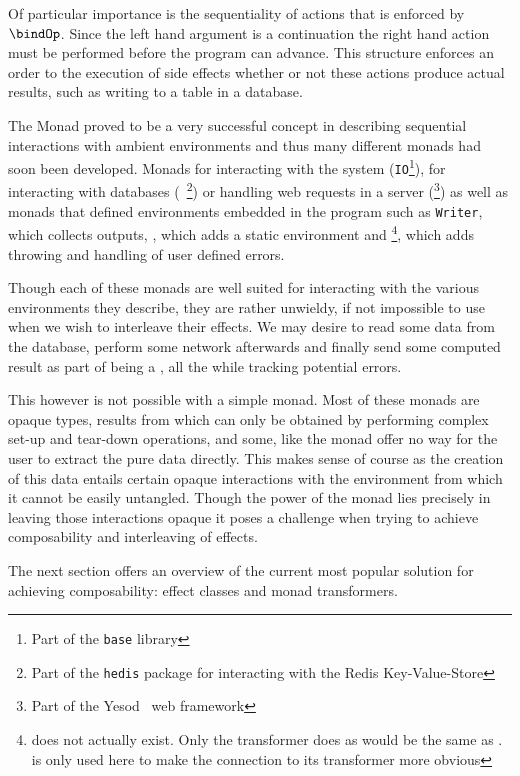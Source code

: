 Of particular importance is the sequentiality of actions that is enforced by
$\bindOp$. Since the left hand argument is a continuation the right hand action
must be performed before the program can advance. This structure enforces an
order to the execution of side effects whether or not these actions produce
actual results, such as writing to a table in a database.

The Monad proved to be a very successful concept in describing
sequential interactions with ambient environments and thus many
different monads had soon been developed. Monads for interacting with
the system (\texttt{IO}\footnote{Part of the \texttt{base} library}),
for interacting with databases (\RedisM{}~\footnote{Part of the
  \texttt{hedis}\cite{hedis} package for interacting with the Redis
  Key-Value-Store}) or handling web requests in a server
(\HandlerForM{}\footnote{Part of the Yesod~\cite{yesod} web
  framework}) as well as monads that defined environments embedded in
the program such as \texttt{Writer}, which collects outputs,
\ReaderM{}, which adds a static environment and
\ExceptM{}\footnote{\ExceptM{} does not actually exist. Only the
  transformer \ExceptT{} does as \ExceptM{} would be the same as
  \EitherM{}. \ExceptM{} is only used here to make the connection to
  its transformer more obvious}, which adds throwing and handling of
user defined errors.

Though each of these monads are well suited for interacting with the
various environments they describe, they are rather unwieldy, if not
impossible to use when we wish to interleave their effects. We may
desire to read some data from the \RedisM{} database, perform some
network \IOM{} afterwards and finally send some computed result as
part of being a \HandlerForM{}, all the while tracking potential
\ExceptM{} errors.

This however is not possible with a simple monad. Most of these monads
are opaque types, results from which can only be obtained by
performing complex set-up and tear-down operations, and some, like the
\HandlerForM{} monad offer no way for the user to extract the pure
data directly. This makes sense of course as the creation of this data
entails certain opaque interactions with the environment from which it
cannot be easily untangled. Though the power of the monad lies
precisely in leaving those interactions opaque it poses a challenge
when trying to achieve composability and interleaving of effects.

The next section offers an overview of the current most popular
solution for achieving composability: effect classes and monad
transformers.
